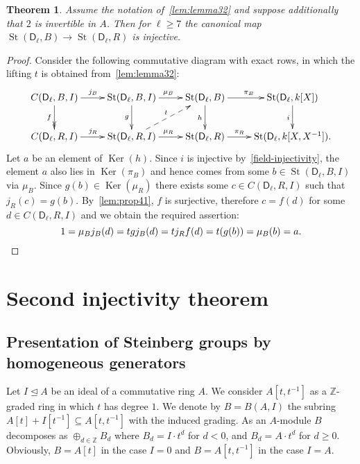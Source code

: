 \documentclass[oneside, 8pt]{amsart}
\newtheorem{theorem}{Theorem}
\theoremstyle{remark}
\theoremstyle{definition}
\DeclareMathOperator{\Ker}{Ker}
\DeclareMathOperator{\St}{St}
\newcommand{\inv}{^{-1}}
\newcommand{\rA}{\mathsf{A}}
\newcommand{\rD}{\mathsf{D}}
\newcommand{\rE}{\mathsf{E}}
\numberwithin{equation}{section}
\begin{document}
\begin{theorem} \label{thm41}
Assume the notation of~\cref{lem:lemma32} and suppose additionally that $2$ is invertible in $A$.
Then for $\ell \geq 7$ the canonical map $\St(\rD_\ell, B) \to \St(\rD_\ell, R)$ is injective.
\end{theorem}
\begin{proof}
 Consider the following commutative diagram with exact rows, in which the lifting $t$ is obtained from~\cref{lem:lemma32}:
\begin{equation*} \xymatrix{
 C(\rD_\ell, B, I) \ar[r]^{j_B} \ar@{->>}[d]_{f} & \St(\rD_\ell, B, I) \ar[r]^{\mu_B} \ar[d]_{g} &
 \St(\rD_\ell, B) \ar[r]^{\pi_B} \ar[d]_{h} & \St(\rD_\ell, k[X]) \ar[d]_{i} \\
 C(\rD_\ell, R, I) \ar[r]^{j_R}         & \St(\rD_\ell, R, I) \ar[r]^{\mu_R} \ar@{-->}[ur]^{t}&
 \St(\rD_\ell, R) \ar[r]^-{\pi_R}        & \St(\rD_\ell, k[X, X^{-1}]).
}\end{equation*}
Let $a$ be an element of $\Ker(h)$. Since $i$ is injective by~\cref{field-injectivity}, the element $a$
 also lies in $\Ker(\pi_B)$ and hence comes from some $b \in \St(\rD_\ell, B, I)$ via $\mu_B$.
Since $g(b) \in \Ker(\mu_R)$ there exists some $c \in C(\rD_\ell, R, I)$ such that $j_R(c) = g(b)$. 
By~\cref{lem:prop41}, $f$ is surjective, therefore $c = f(d)$ for some $d \in C(\rD_\ell, R, I)$ and we obtain the required assertion:
 \[ 1 = \mu_Bj_B(d) = tgj_B(d) = tj_Rf(d) =t(g(b)) = \mu_B(b) = a. \qedhere \]
\end{proof}

\section{Second injectivity theorem}

\subsection{Presentation of Steinberg groups by homogeneous generators}
Let $I\trianglelefteq A$ be an ideal of a commutative ring $A$.
We consider $A[t, t\inv]$ as a $\mathbb{Z}$-graded ring in which $t$ has degree $1$.
We denote by $B = B(A, I)$ the subring $A[t] + I[t\inv] \subseteq A[t, t\inv]$ with the induced grading.
As an $A$-module $B$ decomposes as $\oplus_{d\in\mathbb Z}B_d$ where $B_d=I \cdot t^d$ for $d<0$, and $B_d=A \cdot t^d$ for $d\geq0$. Obviously, $B = A[t]$ in the case $I=0$ and $B = A[t, t\inv]$ in the case $I=A$.
\end{document}
